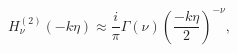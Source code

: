 \begin{equation}
  H^{(2)}_\nu (-k\eta)\approx 
  \frac{i}{\pi}\Gamma(\nu)\left(\frac{-k\eta}{2}\right)^{-\nu},
\end{equation}

